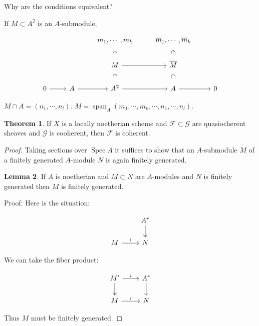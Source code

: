 \documentclass{article}
\theoremstyle{definition}
\newtheorem{theorem}{Theorem}
\newtheorem{lemma}[theorem]{Lemma}
\begin{document}
    Why are the conditions equivalent?

    If \(M \subset A^2\) is an \(A\)-submodule,

    \[
        \begin{tikzcd}
            & & m_1 , \cdots , m_k \ar[d,"\in", phantom, sloped] & \overline{m}_1 , \cdots , \overline{m}_k \ar[d, "\in", phantom, sloped] \\ & & M \ar[d,"\subset", phantom, sloped] \ar[r] & \overline{M} \ar[d,"\subset", phantom, sloped] \\ 0 \ar[r] & A \ar[r] & A^2 \ar[r] & A \ar[r] & 0  
        \end{tikzcd}
    \]

    \(M \cap A = (n_1 , \cdots , n_l)\). \(M = \operatorname{span}_A(m_1 , \cdots , m_k , \cdots , n_1 , \cdots , n_l)\).  

    \begin{theorem}
        If \(X\) is a locally noetherian scheme and \(\mathcal{F} \subset \mathcal{G}\) are quasiocherent sheaves and \(\mathcal{G}\) is cooherent, then \(\mathcal{F}\) is coherent.
    \end{theorem}

    \begin{proof}
        Taking sections over \(\operatorname{Spec} A\) it suffices to show that an \(A\)-submodule \(M\) of a finitely generated \(A\)-module \(N\) is again finitely generated.

        \begin{lemma}
            If \(A\) is noetherian and \(M \subset N\) are \(A\)-modules and \(N\) is finitely generated then \(M\) is finitely generated.
        \end{lemma}

        Proof: Here is the situation:
        
        \[
            \begin{tikzcd}
                & A^r \ar[d, two heads] \\ M \ar[r, "i"] & N
            \end{tikzcd}
        \]

        We can take the fiber product:

        \[
            \begin{tikzcd}
                M^{\prime} \ar[r, "i"] \ar[d, two heads] & A^r \ar[d] \\ M \ar[r, "i"] & N 
            \end{tikzcd}
        \]

        Thus \(M\) must be finitely generated.

    \end{proof}
\end{document}

